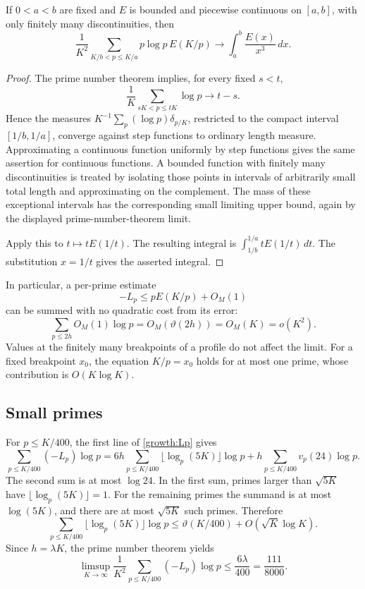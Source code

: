 \begin{lemma}\label{growth:prime-sum}
If \(0<a<b\) are fixed and \(E\) is bounded and piecewise continuous on
\([a,b]\), with only finitely many discontinuities, then
\[
 \frac1{K^2}\sum_{K/b<p\le K/a}p\log p\,E(K/p)
 \longrightarrow \int_a^b\frac{E(x)}{x^3}\,dx .
\]
\end{lemma}
\begin{proof}
The prime number theorem implies, for every fixed \(s<t\),
\[
 \frac1K\sum_{sK<p\le tK}\log p\longrightarrow t-s.
\]
Hence the measures
\(K^{-1}\sum_p(\log p)\delta_{p/K}\), restricted to the compact interval
\([1/b,1/a]\), converge against step functions to ordinary length
measure. Approximating a continuous function uniformly by step functions
gives the same assertion for continuous functions. A bounded function
with finitely many discontinuities is treated by isolating those points
in intervals of arbitrarily small total length and approximating on
the complement. The mass of these exceptional intervals has the
corresponding small limiting upper bound, again by the displayed
prime-number-theorem limit.

Apply this to \(t\mapsto tE(1/t)\). The resulting integral is
\(\int_{1/b}^{1/a}tE(1/t)\,dt\). The substitution \(x=1/t\) gives the
asserted integral.
\end{proof}

In particular, a per-prime estimate
\[
 -L_p\le pE(K/p)+O_M(1)
\]
can be summed with no quadratic cost from its error:
\[
 \sum_{p\le2h}O_M(1)\log p=O_M(\vartheta(2h))=O_M(K)=o(K^2).
\]
Values at the finitely many breakpoints of a profile do not affect
the limit. For a fixed breakpoint \(x_0\), the equation \(K/p=x_0\)
holds for at most one prime, whose contribution is \(O(K\log K)\).

\subsection{Small primes}

For \(p\le K/400\), the first line of \eqref{growth:Lp} gives
\[
 \sum_{p\le K/400}(-L_p)\log p
 =
 6h\sum_{p\le K/400}\lfloor\log_p(5K)\rfloor\log p
 +h\sum_{p\le K/400}v_p(24)\log p.
\]
The second sum is at most \(\log24\). In the first sum, primes larger
than \(\sqrt{5K}\) have \(\lfloor\log_p(5K)\rfloor=1\). For the
remaining primes the summand is at most \(\log(5K)\), and there are
at most \(\sqrt{5K}\) such primes. Therefore
\[
 \sum_{p\le K/400}\lfloor\log_p(5K)\rfloor\log p
 \le\vartheta(K/400)+O(\sqrt K\log K).
\]
Since \(h=\lambda K\), the prime number theorem yields
\begin{equation}\label{growth:small}
 \limsup_{K\to\infty}\frac1{K^2}
 \sum_{p\le K/400}(-L_p)\log p
 \le\frac{6\lambda}{400}=\frac{111}{8000}.
\end{equation}

